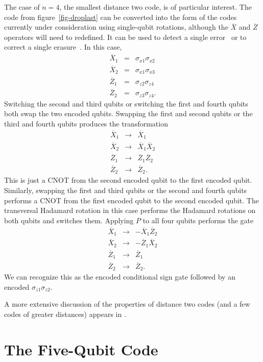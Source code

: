 \documentclass{report}
\newcommand{\Xs}[1]{\sigma_{x{#1}}}
\newcommand{\Zs}[1]{\sigma_{z{#1}}}
\newcommand{\Xbar}{\overline{X}}
\newcommand{\Zbar}{\overline{Z}}
\begin{document}
The case of $n=4$, the smallest distance two code, is of particular interest.  
The code from figure~\ref{fig-droplast} can be converted into the form of
the codes currently under consideration using single-qubit rotations,
although the $\Xbar$ and $\Zbar$ operators will need to redefined.  It 
can be used to detect a single error~\cite{vaidman} or to correct a single 
erasure~\cite{grassl}.  In this case,
\begin{eqnarray}
\Xbar_1 & = & \Xs{1} \Xs{2} \nonumber \\
\Xbar_2 & = & \Xs{1} \Xs{3} \nonumber \\
\Zbar_1 & = & \Zs{2} \Zs{4} \\
\Zbar_2 & = & \Zs{3} \Zs{4}. \nonumber
\end{eqnarray}
Switching the second and third qubits or switching the first and fourth qubits 
both swap the two encoded qubits.  Swapping the first and second qubits or the 
third and fourth qubits produces the transformation
\begin{eqnarray}
\Xbar_1 & \rightarrow & \Xbar_1 \nonumber \\
\Xbar_2 & \rightarrow & \Xbar_1 \Xbar_2 \nonumber \\
\Zbar_1 & \rightarrow & \Zbar_1 \Zbar_2 \\
\Zbar_2 & \rightarrow & \Zbar_2. \nonumber
\end{eqnarray}
This is just a CNOT from the second encoded qubit to the first encoded 
qubit.  Similarly, swapping the first and third qubits or the second and fourth 
qubits performs a CNOT from the first encoded qubit to the second encoded 
qubit.  The transversal Hadamard rotation in this case performs the 
Hadamard rotations on both qubits and switches them.  Applying $P$ to all 
four qubits performs the gate
\begin{eqnarray}
\Xbar_1 & \rightarrow & - \Xbar_1 \Zbar_2 \nonumber \\
\Xbar_2 & \rightarrow & - \Zbar_1 \Xbar_2 \nonumber \\
\Zbar_1 & \rightarrow & \Zbar_1 \\
\Zbar_2 & \rightarrow & \Zbar_2. \nonumber
\end{eqnarray}
We can recognize this as the encoded conditional sign gate followed by an 
encoded $\Zs{1} \Zs{2}$.

A more extensive discussion of the properties of distance two codes (and a
few codes of greater distances) appears in \cite{rains-dist2}.

\section{The Five-Qubit Code}
\end{document}

